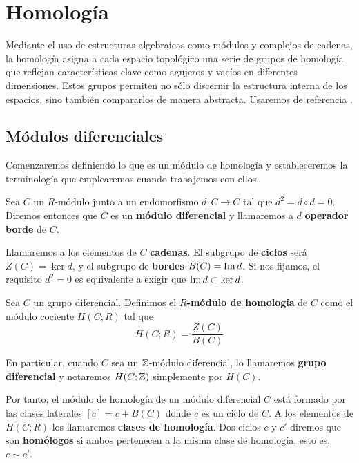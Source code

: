 
\chapter{Homología}

Mediante el uso de estructuras algebraicas como módulos y complejos de cadenas, la homología asigna a cada espacio topológico una serie de grupos de homología, que reflejan características clave como agujeros y vacíos en diferentes dimensiones. Estos grupos permiten no sólo discernir la estructura interna de los espacios, sino también compararlos de manera abstracta. Usaremos de referencia \cite{maclane2012homology}.

\section{Módulos diferenciales}

Comenzaremos definiendo lo que es un módulo de homología y estableceremos la terminología que emplearemos cuando trabajemos con ellos.

\begin{definicion}
	Sea $C$ un $R$-módulo junto a un endomorfismo  $d: C \rightarrow C$ tal que $d^2 = d \circ d = 0$. Diremos entonces que $C$ es un \textbf{módulo diferencial} y llamaremos a $d$ \textbf{operador borde} de $C$.
\end{definicion}

Llamaremos a los elementos de $C$ \textbf{cadenas}. El subgrupo de \textbf{ciclos} será $Z(C) = \ker d$,  y el subgrupo de \textbf{bordes} $B(C) = \operatorname{Im} d$. Si nos fijamos, el requisito $d^2 = 0$ es equivalente a exigir que $\operatorname{Im}{d} \subset \ker{d}$.

\begin{definicion}
	Sea $C$ un grupo diferencial. Definimos el \textbf{$R$-módulo de homología} de $C$ como el módulo cociente $H(C;R)$ tal que 
	\[ H(C;R) = \frac{Z(C)}{B(C)}\]
\end{definicion}

En particular, cuando $C$ sea un $\mathbb{Z}$-módulo diferencial, lo llamaremos \textbf{grupo diferencial} y notaremos $H(C;\mathbb{Z})$ simplemente por $H(C)$. 

Por tanto, el módulo de homología de un módulo diferencial $C$ está formado por las clases laterales $[c] = c + B(C)$ donde $c$ es un ciclo de $C$. A los elementos de $H(C;R)$ los llamaremos \textbf{clases de homología}. Dos ciclos $c$ y $c'$ diremos que son \textbf{homólogos} si ambos pertenecen a la misma clase de homología, esto es, $c \sim c'$.

